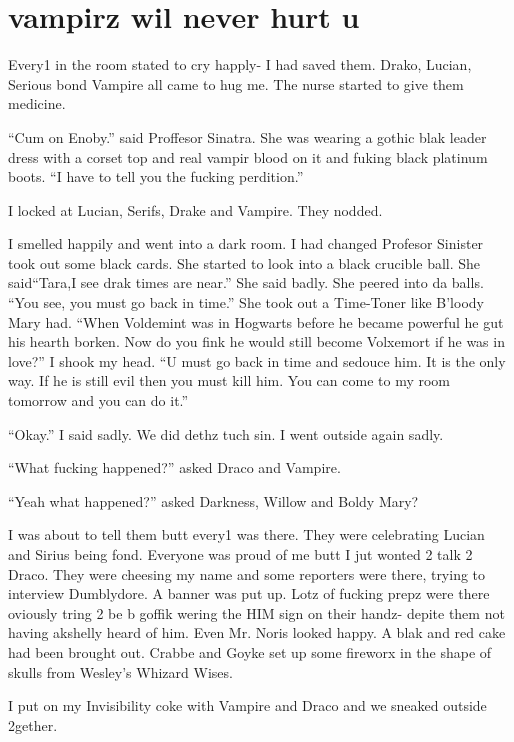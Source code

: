 \section{vampirz wil never hurt u}



Every1 in the room stated to cry happly- I had saved them. Drako, Lucian, Serious bond Vampire all came to hug me. The nurse started to give them medicine.

\enquote{Cum on Enoby.} said Proffesor Sinatra. She was wearing a gothic blak leader dress with a corset top and real vampir blood on it and fuking black platinum boots. \enquote{I have to tell you the fucking perdition.}

I locked at Lucian, Serifs, Drake and Vampire. They nodded.

I smelled happily and went into a dark room. I had changed Profesor Sinister took out some black cards. She started to look into a black crucible ball. She said\dotfill \enquote{Tara,\newline I see drak times are near.} She said badly. She peered into da balls. \enquote{You see, you must go back in time.} She took out a Time-Toner like B'loody Mary had. \enquote{When Voldemint was in Hogwarts before he became powerful he gut his hearth borken. Now do you fink he would still become Volxemort if he was in love?} I shook my head. \enquote{U must go back in time and sedouce him. It is the only way. If he is still evil then you must kill him. You can come to my room tomorrow and you can do it.}

\enquote{Okay.} I said sadly. We did dethz tuch sin. I went outside again sadly.

\enquote{What fucking happened?} asked Draco and Vampire.

\enquote{Yeah what happened?} asked Darkness, Willow and Boldy Mary?

I was about to tell them butt every1 was there. They were celebrating Lucian and Sirius being fond. Everyone was proud of me butt I jut wonted 2 talk 2 Draco. They were cheesing my name and some reporters were there, trying to interview Dumblydore. A banner was put up. Lotz of fucking prepz were there oviously tring 2 be b goffik wering the HIM sign on their handz- depite them not having akshelly heard of him. Even Mr. Noris looked happy. A blak and red cake had been brought out. Crabbe and Goyke set up some fireworx in the shape of skulls from Wesley's Whizard Wises.

I put on my Invisibility coke with Vampire and Draco and we sneaked outside 2gether.

